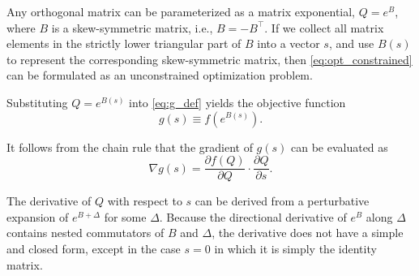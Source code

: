 \documentclass[pdflatex,sn-mathphys-num]{sn-jnl}
\newcommand{\bfA}[1]{{\textbf A}(#1)}
\newcommand{\jw}[1]{{{\color{purple} (JW: #1)}}}
\begin{document}
Any orthogonal matrix can be parameterized as a matrix exponential, $Q=e^B$, where $B$ is a skew-symmetric matrix, i.e., $B = -B^{\top}$. If we collect all matrix elements in the strictly lower triangular part of $B$ into a vector $s$, and use $B(s)$ to represent the corresponding skew-symmetric matrix, then \eqref{eq:opt_constrained} can be formulated as an unconstrained optimization problem.

Substituting $Q=e^{B(s)}$ into \eqref{eq:g_def} yields the objective function 
\begin{equation}
g(s) \equiv f(e^{B(s)}).
\end{equation}

It follows from the chain rule that the gradient of $g(s)$ can be evaluated as 
\begin{equation}
\nabla g(s) = \frac{\partial f(Q)}{\partial Q} \cdot \frac{\partial Q}{\partial s}.
\end{equation}

The derivative of $Q$ with respect to $s$ can be derived from a perturbative expansion of $e^{B+\Delta}$ for some $\Delta$. Because the directional derivative of $e^{B}$ along $\Delta$ contains nested commutators of $B$ and $\Delta$, the derivative does not have a simple and closed form, except in the case $s=0$ in which it is simply the identity matrix.
\end{document}
